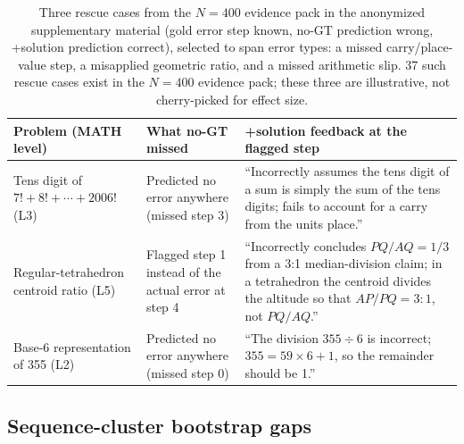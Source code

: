 \documentclass{article}
\begin{document}
\begin{table}[t]
\centering
\small
\begin{tabular}{p{2.4cm}p{4.6cm}p{5.4cm}}
\toprule
Problem (MATH level) & What no-GT missed & +solution feedback at the flagged step \\
\midrule
Tens digit of $7!+8!+\cdots+2006!$ (L3) & Predicted no error anywhere (missed step 3) & ``Incorrectly assumes the tens digit of a sum is simply the sum of the tens digits; fails to account for a carry from the units place.'' \\
Regular-tetrahedron centroid ratio (L5) & Flagged step 1 instead of the actual error at step 4 & ``Incorrectly concludes $PQ/AQ=1/3$ from a 3{:}1 median-division claim; in a tetrahedron the centroid divides the altitude so that $AP/PQ=3{:}1$, not $PQ/AQ$.'' \\
Base-6 representation of 355 (L2) & Predicted no error anywhere (missed step 0) & ``The division $355 \div 6$ is incorrect; $355 = 59 \times 6 + 1$, so the remainder should be 1.'' \\
\bottomrule
\end{tabular}
\caption{Three rescue cases from the $N{=}400$ evidence pack in the
anonymized supplementary material
(gold error step known, no-GT prediction wrong, +solution prediction correct),
selected to span error types: a missed carry/place-value step, a misapplied
geometric ratio, and a missed arithmetic slip. 37 such rescue cases exist in
the $N{=}400$ evidence pack; these three are illustrative, not
cherry-picked for effect size.}
\label{tab:flip-cases}
\end{table}

\subsection{Sequence-cluster bootstrap gaps}
\label{app:bootstrap}
\end{document}
